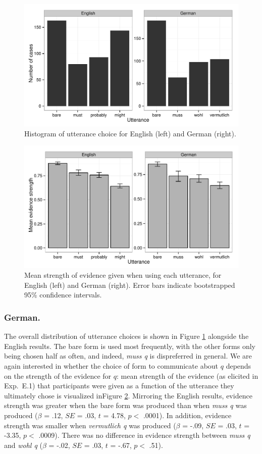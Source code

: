 \documentclass[11pt]{article}
\newcommand{\figref}[1]{Figure \ref{#1}}
\begin{document}
\begin{figure}
\centering
\includegraphics[width=.9\textwidth]{pics/production-distribution}
\caption{Histogram of utterance choice for English (left) and German (right).}
\label{fig:utterances}
\end{figure}

\begin{figure}
\centering
\includegraphics[width=.9\textwidth]{pics/mean-production-evidence}
\caption{Mean strength of evidence given when using each utterance, for English (left) and German (right). Error bars indicate bootstrapped 95\% confidence intervals.}
\label{fig:utterances-estrength}
\end{figure}


\subsubsection{German.} The overall distribution of utterance choices is shown in \figref{fig:utterances} alongside the English results. The bare form is used most frequently, with the other forms only being chosen half as often, and indeed, \emph{muss q} is dispreferred in general. We are again interested in whether the choice of form to communicate about $q$ depends on the strength of the evidence for $q$: mean strength of the evidence (as elicited in Exp.~E.1) that participants were given as a function of the utterance they ultimately chose is visualized in\figref{fig:utterances-estrength}.  Mirroring the English results, evidence strength was greater when the bare form was produced than when \emph{muss q} was produced ($\beta$ = .12, $SE$ = .03, $t$ = 4.78, $p <$ .0001). In addition, evidence strength was smaller when \emph{vermutlich q} was produced  ($\beta$ = -.09, $SE$ = .03, $t$ = -3.35, $p <$ .0009). There was no difference in evidence strength between \emph{muss q} and \emph{wohl q}  ($\beta$ = -.02, $SE$ = .03, $t$ = -.67, $p <$ .51). 
\end{document}
